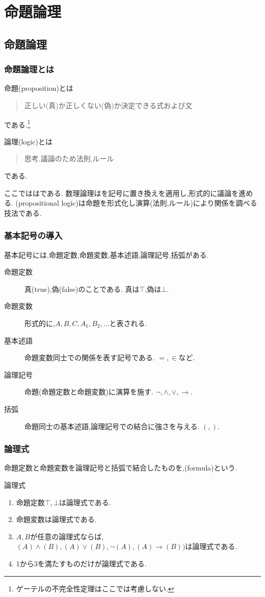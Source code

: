\chapter{命題論理}
\section{命題論理}
\subsection{命題論理とは}
命題(proposition)とは
\begin{quotation}
 正しい(真)か正しくない(偽)か決定できる式および文
\end{quotation}
である.\footnote{ゲーテルの不完全性定理はここでは考慮しない.}

論理(logic)とは
\begin{quotation}
 思考,議論のため法則,ルール
\end{quotation}
である.

ここでははである.
数理論理はを記号に置き換えを適用し,形式的に議論を進める.
(propositional logic)は命題を形式化し演算(法則,ルール)により関係を調べる技法である.

\subsection{基本記号の導入}
基本記号には,命題定数,命題変数,基本述語,論理記号,括弧がある.
\begin{description}
 \item[命題定数] 真(true),偽(false)のことである. 真は$\top$,偽は$\bot$.
 \item[命題変数] 形式的に,$A,B,C,A_1,B_2,...$と表される.
 \item[基本述語] 命題変数同士での関係を表す記号である. $=,\in$など.
 \item[論理記号] 命題(命題定数と命題変数)に演算を施す. $\lnot,\land,\lor,\to$.
 \item[括弧] 命題同士の基本述語,論理記号での結合に強さを与える. $(,)$.
\end{description}

\subsection{論理式}
命題定数と命題変数を論理記号と括弧で結合したものを,(formula)という.
\begin{dfn}
 論理式
 \begin{enumerate}
  \item 命題定数$\top,\bot$は論理式である.
  \item 命題変数は論理式である.
  \item $A,B$が任意の論理式ならば,$(A) \land (B),(A) \lor (B), \lnot (A), (A) \to (B))$は論理式である.
  \item 1から3を満たすものだけが論理式である.
 \end{enumerate}
\end{dfn}

